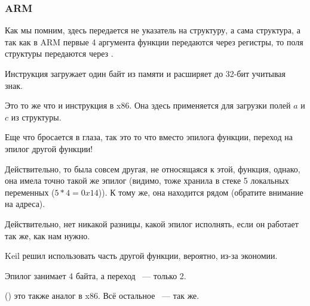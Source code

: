 \subsubsection{ARM}

\myparagraph{\OptimizingKeilVI (\ThumbMode)}



Как мы помним, здесь передается не указатель на структуру, а сама структура, а так как в ARM первые 4 аргумента
функции передаются через регистры, то поля структуры передаются через .

Инструкция  загружает один байт из памяти и расширяет до 32-бит учитывая знак.

Это то же что и инструкция \MOVSX в x86.
Она здесь применяется для загрузки полей $a$ и $c$ из структуры.

Еще что бросается в глаза, так это то что вместо эпилога функции, переход на эпилог другой функции!

Действительно, то была совсем другая, не относящаяся к этой, функция, однако, она имела точно такой же эпилог 
(видимо, тоже хранила в стеке 5 локальных переменных ($5*4=0x14$)).
К тому же, она находится рядом (обратите внимание на адреса).

Действительно, нет никакой разницы, какой эпилог исполнять, если он работает так же, как нам нужно.

Keil решил использовать часть другой функции, вероятно, из-за экономии.

Эпилог занимает 4 байта, а переход ~--- только 2.




 () это также аналог \MOVSX в x86.
Всё остальное ~--- так же.

